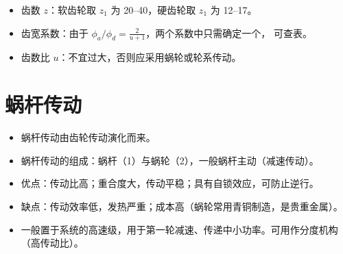 \documentclass[12pt,a4paper]{article}
\newcommand{\tightlist}{\setlength{\parskip}{0pt}\setlength{\itemsep}{0pt}}
\newcommand{\hint}[1]{\textsf{（#1）}}
\begin{document}
\begin{itemize}
\begin{itemize}
\begin{gather}
{{        \cdot Y_{Sa}}{[\sigma_F]}\right)}\\
        a\geq(u+1)\sqrt[3]{\frac{500KT_1}{\phi_au}\left(\frac{Z_EZ_HZ_\varepsilon
        }{[\sigma_H]}\right)^2}
        \end{gather}
        \item 齿数 $z$：软齿轮取 $z_1$ 为 20--40，硬齿轮取 $z_1$ 为 12--17。
        \item 齿宽系数：由于 $\phi_a/\phi_d=\frac{2}{u+1}$，两个系数中只需确定一个，
        可查表。
        \item 齿数比 $u$：不宜过大，否则应采用蜗轮或轮系传动。
    \end{itemize}
\end{itemize}

\section{蜗杆传动}
\begin{itemize}\tightlist
    \item 蜗杆传动由齿轮传动演化而来。
    \item 蜗杆传动的组成：蜗杆（1）与蜗轮（2），一般蜗杆主动\hint{减速传动}。
    \item 优点：传动比高；重合度大，传动平稳；具有自锁效应，可防止逆行。
    \item 缺点：传动效率低，发热严重；成本高\hint{蜗轮常用青铜制造，是贵重金属}。
    \item 一般置于系统的高速级，用于第一轮减速、传递中小功率。可用作分度机构
    \hint{高传动比}。
\end{itemize}
\end{document}

